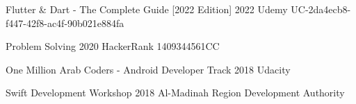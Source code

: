 

\begin{cvcertificates}

  \cvcertificate
    {Flutter \& Dart - The Complete Guide [2022 Edition]} %
    {2022} %
    {Udemy} %
    {UC-2da4ecb8-f447-42f8-ac4f-90b021e884fa} %

  \cvcertificate
    {Problem Solving} %
    {2020} %
    {HackerRank} %
    {1409344561CC} %

  \cvcertificate
    {One Million Arab Coders - Android Developer Track} %
    {2018} %
    {Udacity} %
    {} %

  \cvcertificate
    {Swift Development Workshop} %
    {2018} %
    {Al-Madinah Region Development Authority} %
    {} %

\end{cvcertificates}
